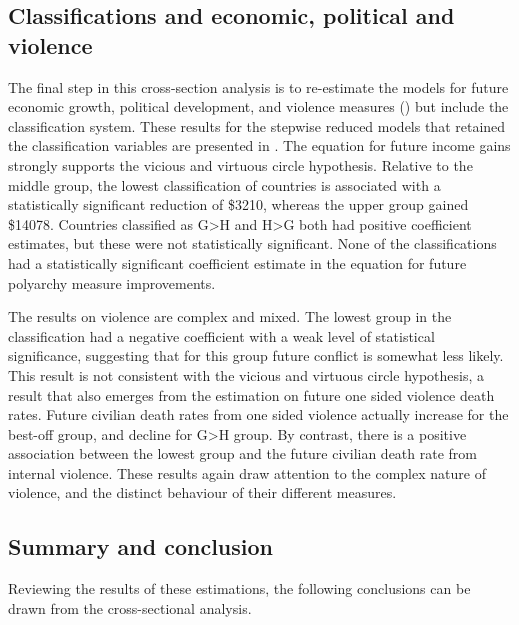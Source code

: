 \documentclass[12pt]{article}
\begin{document}
\subsection{Classifications and economic, political and violence}

The final step in this cross-section analysis is to re-estimate the models for future economic growth, political development, and violence measures () but include the classification system. These results for the stepwise reduced models that retained the classification variables are presented in . The equation for future income gains strongly supports the vicious and virtuous circle hypothesis. Relative to the middle group, the lowest classification of countries is associated with a statistically significant reduction of \$3210, whereas the upper group gained \$14078. Countries classified as G>H and H>G both had positive coefficient estimates, but these were not statistically significant. None of the classifications had a statistically significant coefficient estimate in the equation for future polyarchy measure improvements.



The results on violence are complex and mixed. The lowest group in the classification had a negative coefficient with a weak level of statistical significance, suggesting that for this group future conflict is somewhat less likely. This result is not consistent with the vicious and virtuous circle hypothesis, a result that also emerges from the estimation on future one sided violence death rates. Future civilian death rates from one sided violence actually increase for the best-off group, and decline for  G>H group. By contrast, there is a positive association between the lowest group and the future civilian death rate from internal violence. These results again draw attention to the complex nature of violence, and the distinct behaviour of their different measures.

\subsection{Summary and conclusion}

Reviewing the results of these estimations, the following conclusions can be drawn from the cross-sectional analysis.
\end{document}
